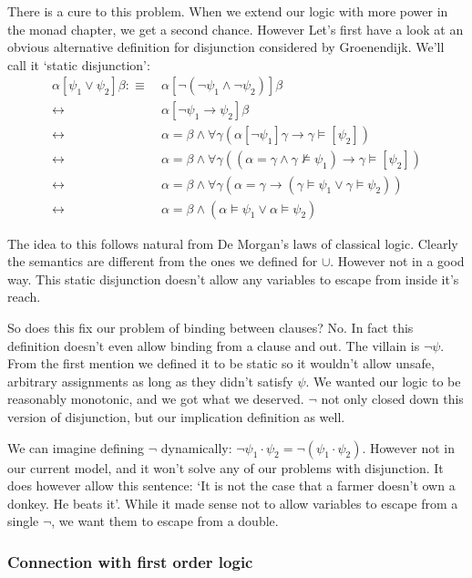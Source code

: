 \documentclass[12pt]{article}
\begin{document}
There is a cure to this problem. When we extend our logic with more power in the monad chapter, we get a second chance. However Let's first have a look at an obvious alternative definition for disjunction considered by Groenendijk\cite{groenendijk1991dynamic}. We'll call it `static disjunction':
\begin{align}
\alpha[\psi_1\vee\psi_2]\beta
 :\equiv&\ \alpha[\neg(\neg\psi_1\wedge\neg\psi_2)]\beta \nonumber\\
 \leftrightarrow&\ \alpha[\neg\psi_1\rightarrow\psi_2]\beta \nonumber\\
 \leftrightarrow&\ \alpha = \beta \wedge \forall\gamma(\alpha[\neg\psi_1]\gamma\rightarrow\gamma\models[\psi_2]) \nonumber\\
 \leftrightarrow&\ \alpha = \beta \wedge \forall\gamma((\alpha=\gamma\wedge\gamma\not\models\psi_1)\rightarrow\gamma\models[\psi_2]) \nonumber\\
 \leftrightarrow&\ \alpha = \beta \wedge \forall\gamma(\alpha=\gamma\rightarrow(\gamma\models\psi_1\vee\gamma\models\psi_2)) \nonumber\\
 \leftrightarrow&\ \alpha = \beta \wedge (\alpha\models\psi_1\vee\alpha\models\psi_2) \label{sem_or}
\end{align}

The idea to this follows natural from De Morgan's laws of classical logic. Clearly the semantics are different from the ones we defined for $\cup$. However not in a good way. This static disjunction doesn't allow any variables to escape from inside it's reach.

So does this fix our problem of binding between clauses? No. In fact this definition doesn't even allow binding from a clause and out. The villain is $\neg\psi$. From the first mention we defined it to be static so it wouldn't allow unsafe, arbitrary assignments as long as they didn't satisfy $\psi$. We wanted our logic to be reasonably monotonic, and we got what we deserved. $\neg$ not only closed down this version of disjunction, but our implication definition as well.

We can imagine defining $\neg$ dynamically: $\neg\psi_1\cdot\psi_2 = \neg(\psi_1\cdot\psi_2)$. However not in our current model, and it won't solve any of our problems with disjunction. It does however allow this sentence: `It is not the case that a farmer doesn't own a donkey. He beats it'. While it made sense not to allow variables to escape from a single $\neg$, we want them to escape from a double.

\subsubsection{Connection with first order logic}
\end{document}
